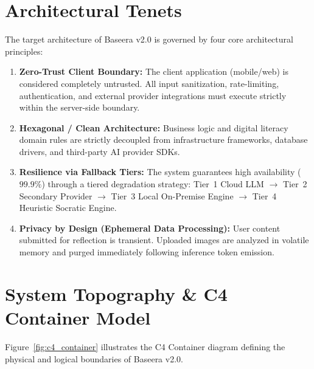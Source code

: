 \documentclass[11pt,a4paper]{report}
\begin{document}
\section{Architectural Tenets}
The target architecture of Baseera v2.0 is governed by four core architectural principles:
\begin{enumerate}[label=\textbf{\Roman*.}]
    \item \textbf{Zero-Trust Client Boundary:} The client application (mobile/web) is considered completely untrusted. All input sanitization, rate-limiting, authentication, and external provider integrations must execute strictly within the server-side boundary.
    \item \textbf{Hexagonal / Clean Architecture:} Business logic and digital literacy domain rules are strictly decoupled from infrastructure frameworks, database drivers, and third-party AI provider SDKs.
    \item \textbf{Resilience via Fallback Tiers:} The system guarantees high availability ($99.9\%$) through a tiered degradation strategy: Tier~1 Cloud LLM $\rightarrow$ Tier~2 Secondary Provider $\rightarrow$ Tier~3 Local On-Premise Engine $\rightarrow$ Tier~4 Heuristic Socratic Engine.
    \item \textbf{Privacy by Design (Ephemeral Data Processing):} User content submitted for reflection is transient. Uploaded images are analyzed in volatile memory and purged immediately following inference token emission.
\end{enumerate}

\section{System Topography \& C4 Container Model}
Figure~\ref{fig:c4_container} illustrates the C4 Container diagram defining the physical and logical boundaries of Baseera v2.0.
\end{document}
